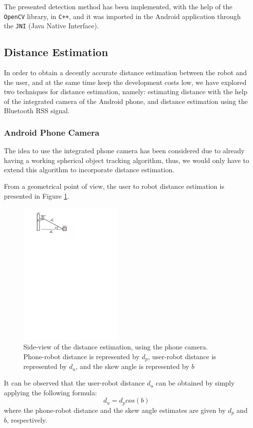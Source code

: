 \documentclass[journal]{IEEEtran}
\let\MYoriglatexcaption\caption
\renewcommand{\caption}[2][\relax]{\MYoriglatexcaption[#2]{#2}}
\begin{document}
The presented detection method has been implemented, with the help of the \texttt{OpenCV} library, in \texttt{C++}, and it was imported in the Android application through the \texttt{JNI} (Java Native Interface).

\subsection{Distance Estimation}
In order to obtain a decently accurate distance estimation between the robot and the user, and at the same time keep the development costs low, we have explored two techniques for distance estimation, namely: estimating distance with the help of the integrated camera of the Android phone, and distance estimation using the Bluetooth RSS signal.

\subsubsection{Android Phone Camera}
The idea to use the integrated phone camera has been considered due to already having a working spherical object tracking algorithm, thus, we would only have to extend this algorithm to incorporate distance estimation.

From a geometrical point of view, the user to robot distance estimation is presented in Figure \ref{fig:dist_camera}.
\begin{figure}[!htpb]
\centering
\includegraphics[width=2in]{images/distance_meas}
\caption{Side-view of the distance estimation, using the phone camera. Phone-robot distance is represented by $d_p$, user-robot distance is represented by $d_u$, and the skew angle is represented by $b$}
\label{fig:dist_camera}
\end{figure}

It can be observed that the user-robot distance $d_u$ can be obtained by simply applying the following formula:
\begin{equation}
d_u=d_pcos(b)
\label{eq:dist_estim}
\end{equation}
where the phone-robot distance and the skew angle estimates are given by $d_p$ and $b$, respectively.
\end{document}
